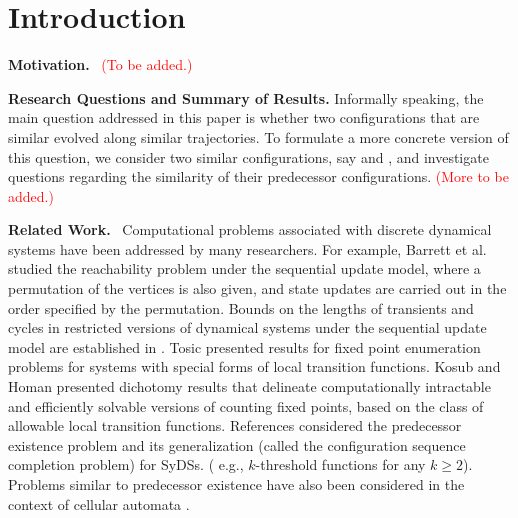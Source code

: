 \section{Introduction}
\label{sec:intro}

\noindent
\textbf{Motivation.}~ \textcolor{red}{(To be added.)}


\smallskip

\noindent
\textbf{Research Questions and Summary of Results.} Informally speaking,
the main question addressed in this paper is whether two configurations
that are similar evolved along similar trajectories.
To formulate a more concrete version of this question, we consider
two similar configurations, say \calcone{} and \calctwo, and
investigate questions regarding the similarity of their predecessor
configurations.
\textcolor{red}{(More to be added.)}


\smallskip

\noindent
\textbf{Related Work.}~
Computational problems associated with 
discrete dynamical systems 
have been addressed by many researchers.
For example, Barrett et al. \cite{BH+06} studied the
reachability problem under the sequential
update model, where a permutation of the vertices is also given,
and state updates are carried out in the order specified by the
permutation.  
Bounds on the lengths of transients and cycles in restricted versions
of dynamical systems under the sequential update model are established
in \cite{MR-2007}.  
Tosic \cite{Tos-2010,Tosic-2017} presented results for fixed point enumeration
problems for systems with special forms of local transition
functions.  Kosub and Homan \cite{KH-2007} presented dichotomy
results that delineate computationally intractable and efficiently
solvable versions of counting fixed points, based on the class of
allowable local transition functions.  
References \cite{BH+07,MR+2018} considered the predecessor existence problem and
its generalization (called the configuration sequence 
completion problem)  for SyDSs.  
( e.g., $k$-threshold functions for any $k \geq 2$).
Problems similar to predecessor existence have
also been considered in the context of cellular automata
\cite{Gre-1987,Dur-1994}.
